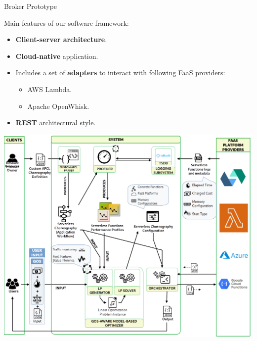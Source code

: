 \documentclass[13.5pt]{beamer}
\newcommand{\B}[1]{\textcolor{TorVergataColor}{\textbf{#1}}}
\begin{document}
\begin{frame}{Broker Prototype}
	
	Main features of our software framework:
	\vspace{\baselineskip}
	\begin{itemize}
		\item \B{Client-server architecture}.
		\item \B{Cloud-native} application.
		\item Includes a set of \B{adapters} to interact with following FaaS providers:
		\begin{itemize}
			\item AWS Lambda.
			\item Apache OpenWhisk.
		\end{itemize}
		\item \B{REST} architectural style.
	\end{itemize}
	
\end{frame} 
\begin{frame}
	
	\begin{center}
		\includegraphics[width=\textwidth,height=0.95\textheight]{../Images/SystemForSlide.png}
	\end{center}
	
	
\end{frame} 
\end{document}
